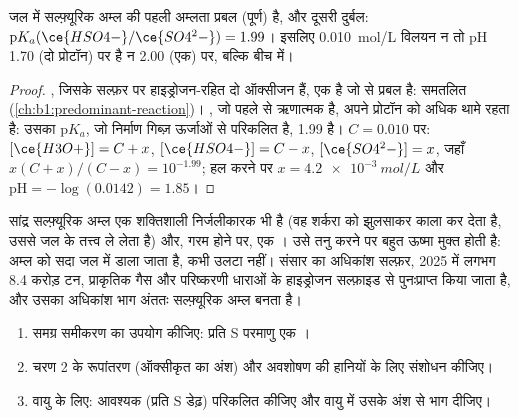 \begin{proposition}[सल्फ़्यूरिक अम्ल की प्रबलता]\label{prop:b1:p-block-16-18:sulfuric-strength}
जल में सल्फ़्यूरिक अम्ल की पहली अम्लता प्रबल (पूर्ण) है, और
दूसरी दुर्बल: $\mathrm{p}K_a(\ce{HSO4-}/\ce{SO4^2-}) = 1.99$। इसलिए
\qty{0.010}{mol/L} विलयन न तो pH 1.70 (दो प्रोटॉन) पर है न
2.00 (एक) पर, बल्कि बीच में।
\end{proposition}

\begin{proof}
, जिसके सल्फ़र पर हाइड्रोजन-रहित दो ऑक्सीजन हैं, एक  है जो
 से प्रबल है: समतलित (\cref{ch:b1:predominant-reaction})।
, जो पहले से ऋणात्मक है, अपने प्रोटॉन को अधिक थामे रहता है: उसका $\mathrm{p}K_a$,
जो निर्माण गिब्ज़ ऊर्जाओं से परिकलित है, 1.99 है। $C = 0.010$ पर:
$[\ce{H3O+}] = C + x$, $[\ce{HSO4-}] = C - x$, $[\ce{SO4^2-}] = x$, जहाँ
$x(C + x)/(C - x) = 10^{-1.99}$; हल करने पर $x = \qty{4.2e-3}{mol/L}$ और
$\mathrm{pH} = -\log(0.0142) = 1.85$।
\end{proof}

सांद्र सल्फ़्यूरिक अम्ल एक शक्तिशाली निर्जलीकारक भी है (वह शर्करा को
झुलसाकर काला कर देता है, उससे जल के तत्त्व ले लेता है) और, गरम होने पर, एक । उसे तनु करने पर
बहुत ऊष्मा मुक्त होती है: अम्ल को सदा जल में डाला जाता है, कभी
उलटा नहीं। संसार का अधिकांश सल्फ़र, 2025 में लगभग 8.4 करोड़ टन,
प्राकृतिक गैस और परिष्करणी धाराओं के हाइड्रोजन सल्फ़ाइड से पुनःप्राप्त किया जाता है,
और उसका अधिकांश भाग अंततः सल्फ़्यूरिक अम्ल बनता है।

\begin{method}[संपर्क प्रक्रम में द्रव्यमान संतुलन]\label{met:b1:p-block-16-18:contact-balance}
\begin{enumerate}
  \item समग्र समीकरण का उपयोग कीजिए: प्रति S परमाणु एक ।
  \item चरण 2 के रूपांतरण (ऑक्सीकृत  का अंश) और अवशोषण की
        हानियों के लिए संशोधन कीजिए।
  \item वायु के लिए: आवश्यक  (प्रति S डेढ़) परिकलित कीजिए और
        वायु में उसके अंश से भाग दीजिए।
\end{enumerate}
\end{method}

